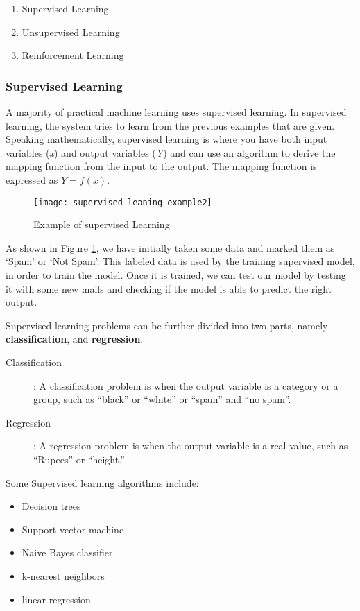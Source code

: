\begin{enumerate}
\item Supervised Learning
\item Unsupervised Learning
\item Reinforcement Learning
\end{enumerate}

\subsubsection{Supervised Learning}
A majority of practical machine learning uses supervised learning. In supervised learning, the system tries to learn from the previous examples that are given. Speaking mathematically, supervised learning is where you have both input variables (\textit{x}) and output variables (\textit{Y}) and can use an algorithm to derive the mapping function from the input to the output. The mapping function is expressed as
$Y = f(x)$.
\begin{figure}[h]
  \centering
  \texttt{[image: supervised\_leaning\_example2]}
  \caption{Example of supervised Learning}
  \label{fig:supervised_learning_example}
\end{figure}

As shown in Figure \ref{fig:supervised_learning_example}, we have initially taken some data and marked them as ‘Spam’ or ‘Not Spam’. This
labeled data is used by the training supervised model, in order to train the model. Once it is trained, we can test our model by testing it with some new mails and checking if the model is able to predict the right output. 

Supervised learning problems can be further divided into two parts, namely \textbf{classification}, and \textbf{regression}.
\begin{description}
\item[ Classification] : A classification problem is when the output variable is a category or a group, such as “black” or “white” or “spam” and “no spam”.
\item[ Regression ] :  A regression problem is when the output variable is a real value, such as “Rupees” or “height.”
\end{description}
Some Supervised learning algorithms include:
\begin{itemize}
\item Decision trees
\item Support-vector machine
\item Naive Bayes classifier
\item k-nearest neighbors
\item linear regression
\end{itemize}

